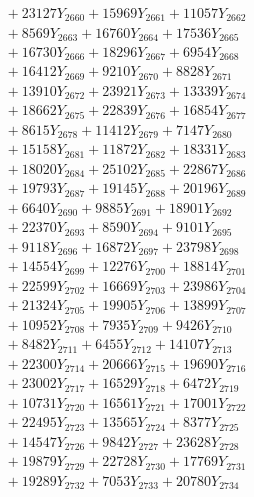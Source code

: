 \documentclass[a4paper,10pt]{article}
\begin{document}
{\begin{align}
&\;  + 23127 Y_{2660} + 15969 Y_{2661} + 11057 Y_{2662} \\[0.3ex]
&\;  + 8569 Y_{2663} + 16760 Y_{2664} + 17536 Y_{2665} \\[0.3ex]
&\;  + 16730 Y_{2666} + 18296 Y_{2667} + 6954 Y_{2668} \\[0.5ex]\allowbreak
&\;  + 16412 Y_{2669} + 9210 Y_{2670} + 8828 Y_{2671} \\[0.3ex]
&\;  + 13910 Y_{2672} + 23921 Y_{2673} + 13339 Y_{2674} \\[0.3ex]
&\;  + 18662 Y_{2675} + 22839 Y_{2676} + 16854 Y_{2677} \\[0.3ex]
&\;  + 8615 Y_{2678} + 11412 Y_{2679} + 7147 Y_{2680} \\[0.3ex]
&\;  + 15158 Y_{2681} + 11872 Y_{2682} + 18331 Y_{2683} \\[0.3ex]
&\;  + 18020 Y_{2684} + 25102 Y_{2685} + 22867 Y_{2686} \\[0.3ex]
&\;  + 19793 Y_{2687} + 19145 Y_{2688} + 20196 Y_{2689} \\[0.3ex]
&\;  + 6640 Y_{2690} + 9885 Y_{2691} + 18901 Y_{2692} \\[0.3ex]
&\;  + 22370 Y_{2693} + 8590 Y_{2694} + 9101 Y_{2695} \\[0.3ex]
&\;  + 9118 Y_{2696} + 16872 Y_{2697} + 23798 Y_{2698} \\[0.5ex]\allowbreak
&\;  + 14554 Y_{2699} + 12276 Y_{2700} + 18814 Y_{2701} \\[0.3ex]
&\;  + 22599 Y_{2702} + 16669 Y_{2703} + 23986 Y_{2704} \\[0.3ex]
&\;  + 21324 Y_{2705} + 19905 Y_{2706} + 13899 Y_{2707} \\[0.3ex]
&\;  + 10952 Y_{2708} + 7935 Y_{2709} + 9426 Y_{2710} \\[0.3ex]
&\;  + 8482 Y_{2711} + 6455 Y_{2712} + 14107 Y_{2713} \\[0.3ex]
&\;  + 22300 Y_{2714} + 20666 Y_{2715} + 19690 Y_{2716} \\[0.3ex]
&\;  + 23002 Y_{2717} + 16529 Y_{2718} + 6472 Y_{2719} \\[0.3ex]
&\;  + 10731 Y_{2720} + 16561 Y_{2721} + 17001 Y_{2722} \\[0.3ex]
&\;  + 22495 Y_{2723} + 13565 Y_{2724} + 8377 Y_{2725} \\[0.3ex]
&\;  + 14547 Y_{2726} + 9842 Y_{2727} + 23628 Y_{2728} \\[0.5ex]\allowbreak
&\;  + 19879 Y_{2729} + 22728 Y_{2730} + 17769 Y_{2731} \\[0.3ex]
&\;  + 19289 Y_{2732} + 7053 Y_{2733} + 20780 Y_{2734} \\[0.3ex]

\end{align}}
\end{document}
